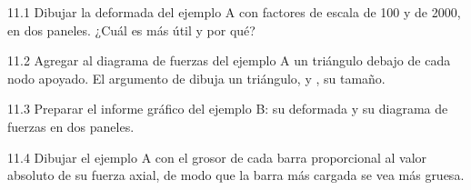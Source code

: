 \ejercicios

\begin{ejercicio}{11.1}
Dibujar la deformada del ejemplo A con factores de escala de 100 y de 2000,
en dos paneles. ¿Cuál es más útil y por qué?
\end{ejercicio}

\begin{ejercicio}{11.2}
Agregar al diagrama de fuerzas del ejemplo A un triángulo debajo de cada
nodo apoyado. El argumento  de  dibuja un
triángulo, y , su tamaño.
\end{ejercicio}

\begin{ejercicio}{11.3}
Preparar el informe gráfico del ejemplo B: su deformada y su diagrama de
fuerzas en dos paneles.
\end{ejercicio}

\begin{ejercicio}{11.4}
Dibujar el ejemplo A con el grosor de cada barra proporcional al valor
absoluto de su fuerza axial, de modo que la barra más cargada se vea más
gruesa.
\end{ejercicio}

